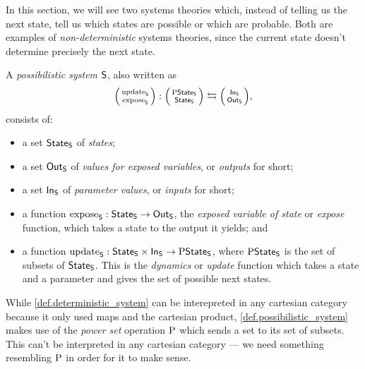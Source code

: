 \documentclass[DynamicalBook]{subfiles}
\begin{document}
In this section, we will see two systems theories which, instead of
telling us the next state, tell us which states are possible or which are
probable. Both are examples of \emph{non-deterministic} systems theories, since the
current state doesn't determine precisely the next state.

\begin{definition}\label{def.possibilistic_system}
  A \emph{possibilistic system} $\mathsf{S}$, also written as 
  $$\lens{\update{S}}{\expose{S}} : \lens{\powset\State{S}}{\State{S}} \leftrightarrows \lens{\In{S}}{\Out{S}},$$ 
  consists of:
  \begin{itemize}
    \item a set $\mathsf{State}_{\mathsf{S}}$ of \emph{states};
    \item a set $\mathsf{Out}_{\mathsf{S}}$ of \emph{values for exposed variables}, or \emph{outputs}
      for short;
    \item a set $\mathsf{In}_{\mathsf{S}}$ of \emph{parameter values}, or \emph{inputs} for short;
    \item a function $\mathrm{expose}_{\mathsf{S}} : \mathsf{State}_{\mathsf{S}} \to \mathsf{Out}_{\mathsf{S}}$, the \emph{exposed variable of state} or
      \emph{expose} function, which takes a state to the output it yields; and
    \item a function $\mathrm{update}_{\mathsf{S}} : \mathsf{State}_{\mathsf{S}} \times \mathsf{In}_{\mathsf{S}} \to
      \mathrm{P}\mathsf{State}_{\mathsf{S}}$, where $\mathrm{P}\mathsf{State}_{\mathsf{S}}$ is the set of subsets of
      $\mathsf{State}_{\mathsf{S}}$. This is the \emph{dynamics} or
      \emph{update} function which takes a state and a parameter and gives the
      set of possible next states.
  \end{itemize}
\end{definition}

\begin{remark}
  While \cref{def.deterministic_system} can be interepreted in any cartesian
  category because it only used maps and the cartesian product,
  \cref{def.possibilistic_system} makes use of the \emph{power set} operation
  $\mathrm{P}$ which sends a set to its set of subsets. This can't be interpreted
  in any cartesian category --- we need something resembling $\mathrm{P}$ in order
  for it to make sense.
\end{remark}
\end{document}
